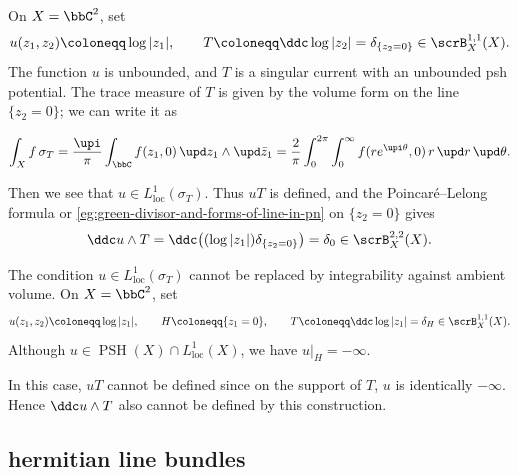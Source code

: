 \begin{example}[label=\labelNFM{eg:wedge-of-unbounded-potentials-and-singular-currents}, status=draft, tag=0000000]
	On $X = \bbC^2$, set
	\[ u(z_1,z_2) \coloneqq \log|z_1|, \qquad T \coloneqq \ddc\log|z_2| = \delta_{\{z_2 = 0\}} \in \scrB_X^{1,1}(X). \]
	The function $u$ is unbounded, and $T$ is a singular current with an unbounded psh potential.
  The trace measure of $T$ is given by the volume form on the line $\{z_2 = 0\}$; we can write it as

  \[ \int_X f\,\sigma_T = \frac{\upi}{\pi}\int_{\bbC} f(z_1,0)\,\upd z_1 \wedge \upd\bar z_1 = \frac{2}{\pi}\int_0^{2\pi}\int_0^\infty f(r e^{\upi\theta},0)\,r\,\upd r\,\upd\theta. \]

  Then we see that $u \in L^1_{\mathrm{loc}}(\sigma_T)$.
	Thus $uT$ is defined, and the Poincar\'e--Lelong formula or \cref{eg:green-divisor-and-forms-of-line-in-pn} on $\{z_2 = 0\}$ gives
	\[ \ddc u \wedge T = \ddc\bigl((\log|z_1|)\delta_{\{z_2 = 0\}}\bigr) = \delta_0 \in \scrB_X^{2,2}(X). \]
\end{example}

\begin{example}[label=\labelNFM{eg:fail-of-wedge-of-unbounded-potentials-and-singular-currents}, status=draft, tag=0000000]
	The condition $u \in L^1_{\mathrm{loc}}(\sigma_T)$ cannot be replaced by integrability against ambient volume.
	On $X = \bbC^2$, set
	\[ u(z_1,z_2) \coloneqq \log|z_1|, \qquad H \coloneqq \{z_1 = 0\}, \qquad T \coloneqq \ddc\log|z_1| = \delta_H \in \scrB_X^{1,1}(X). \]
	Although $u \in \operatorname{PSH}(X) \cap L^1_{\mathrm{loc}}(X)$, we have $u|_H = -\infty$.

  In this case, $uT$ cannot be defined since on the support of $T$, $u$ is identically $-\infty$.
  Hence $\ddc u \wedge T$ also cannot be defined by this construction.

\end{example}





















\subsection[status=draft,tag=0000000,label=\labelNFM{subsec:review-of-metrics}]{hermitian line bundles}

